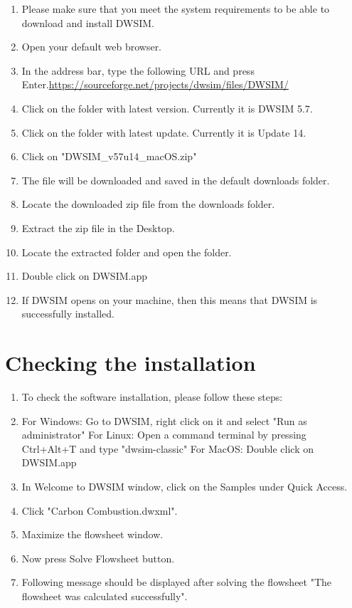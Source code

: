 \documentclass[12pt,a4paper]{article}
\begin{document}
\begin{enumerate}
\item Please make sure that you meet the system requirements to be able to download and install DWSIM.
\item Open your default web browser.
\item In the address bar, type the following URL and press Enter.\newline \url{https://sourceforge.net/projects/dwsim/files/DWSIM/}

\item Click on the folder with latest version. Currently it is DWSIM 5.7.

\item Click on the folder with latest update. Currently it is Update 14.
\item Click on "DWSIM\_v57u14\_macOS.zip"
\item The file will be downloaded and saved in the default downloads folder.
\item Locate the downloaded zip file from the downloads folder.
\item Extract the zip file in the Desktop.
\item Locate the extracted folder and open the folder.
\item Double click on DWSIM.app
\item If DWSIM opens on your machine, then this means that DWSIM is successfully installed.

\end{enumerate}

\section{Checking the installation}

\begin{enumerate}

\item To check the software installation, please follow these steps:
\item For Windows: Go to DWSIM, right click on it and select "Run as administrator"
\newline For Linux: Open a command terminal by pressing Ctrl+Alt+T and type "dwsim-classic"
\newline For MacOS: Double click on DWSIM.app
\item In Welcome to DWSIM window, click on the Samples under Quick Access.
\item Click "Carbon Combustion.dwxml".
\item Maximize the flowsheet window.
\item Now press Solve Flowsheet button.
\item Following message should be displayed after solving the flowsheet "The flowsheet was calculated successfully".

\end{enumerate}
\end{document}
